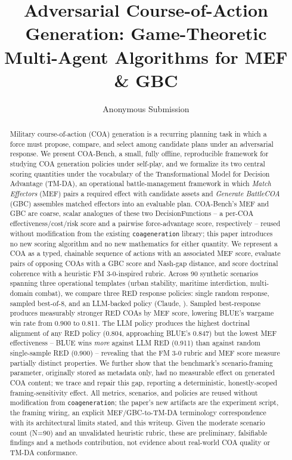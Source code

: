 \documentclass[letterpaper]{article} %
\title{Adversarial Course-of-Action Generation: Game-Theoretic Multi-Agent Algorithms for MEF \& GBC}
\author{Anonymous Submission}
\begin{document}
\maketitle

\begin{abstract}
Military course-of-action (COA) generation is a recurring planning task in which a force must propose, compare, and select among candidate plans under an adversarial response. We present COA-Bench, a small, fully offline, reproducible framework for studying COA generation policies under self-play, and we formalize its two central scoring quantities under the vocabulary of the Transformational Model for Decision Advantage (TM-DA), an operational battle-management framework in which \emph{Match Effectors} (MEF) pairs a required effect with candidate assets and \emph{Generate BattleCOA} (GBC) assembles matched effectors into an evaluable plan. COA-Bench's MEF and GBC are coarse, scalar analogues of these two DecisionFunctions -- a per-COA effectiveness/cost/risk score and a pairwise force-advantage score, respectively -- reused without modification from the existing \texttt{coageneration} library; this paper introduces no new scoring algorithm and no new mathematics for either quantity. We represent a COA as a typed, chainable sequence of actions with an associated MEF score, evaluate pairs of opposing COAs with a GBC score and Nash-gap distance, and score doctrinal coherence with a heuristic FM 3-0-inspired rubric. Across 90 synthetic scenarios spanning three operational templates (urban stability, maritime interdiction, multi-domain combat), we compare three RED response policies: single random response, sampled best-of-8, and an LLM-backed policy (Claude, ). Sampled best-response produces measurably stronger RED COAs by MEF score, lowering BLUE's wargame win rate from 0.900 to 0.811. The LLM policy produces the highest doctrinal alignment of any RED policy (0.804, approaching BLUE's 0.847) but the lowest MEF effectiveness -- BLUE wins \emph{more} against LLM RED (0.911) than against random single-sample RED (0.900) -- revealing that the FM 3-0 rubric and MEF score measure partially distinct properties. We further show that the benchmark's scenario-framing parameter, originally stored as metadata only, had no measurable effect on generated COA content; we trace and repair this gap, reporting a deterministic, honestly-scoped framing-sensitivity effect. All metrics, scenarios, and policies are reused without modification from \texttt{coageneration}; the paper's new artifacts are the experiment script, the framing wiring, an explicit MEF/GBC-to-TM-DA terminology correspondence with its architectural limits stated, and this writeup. Given the moderate scenario count (N=90) and an unvalidated heuristic rubric, these are preliminary, falsifiable findings and a methods contribution, not evidence about real-world COA quality or TM-DA conformance.
\end{abstract}
\end{document}
